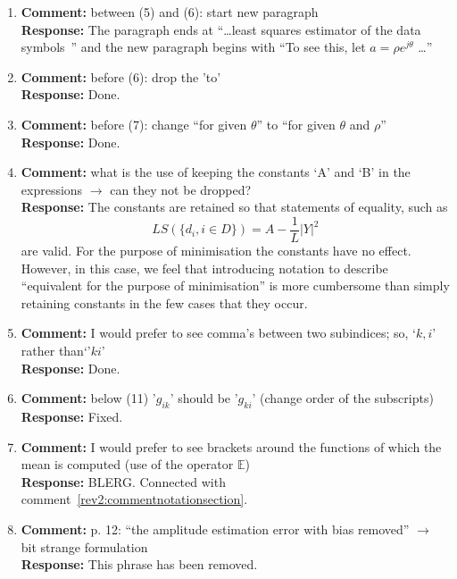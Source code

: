 \documentclass{article}
\newcommand{\abs}[1]{{\left\vert #1 \right\vert}}
\begin{document}
\begin{enumerate}
\item \textbf{Comment:} between (5) and (6): start new paragraph \\
\textbf{Response:} The paragraph ends at ``\dots least squares estimator of the data symbols~\cite{Sweldens2001,Mackenthun1994}'' and the new paragraph begins with ``To see this, let $a = \rho e^{j\theta}$ \dots''

\item \textbf{Comment:} before (6): drop the 'to' \\
\textbf{Response:} Done.

\item \textbf{Comment:} before (7): change ``for given $\theta$'' to ``for given $\theta$ and $\rho$'' \\
\textbf{Response:} Done.

\item \textbf{Comment:} what is the use of keeping the constants `A' and `B' in the expressions $\to$ can they not be dropped? \\
\textbf{Response:} The constants are retained so that statements of equality, such as
\[
LS(\{d_i, i \in D\}) = A - \frac{1}{L}\abs{Y}^2
\]
are valid. For the purpose of minimisation the constants have no effect.  However, in this case, we feel that introducing notation to describe ``equivalent for the purpose of minimisation'' is more cumbersome than simply retaining constants in the few cases that they occur.

\item \textbf{Comment:} I would prefer to see comma's between two subindices; so, `$k,i$' rather than`'$ki$' \\
\textbf{Response:} Done.

\item \textbf{Comment:} below (11) '$g_{ik}$' should be '$g_{ki}$' (change order of the subscripts) \\
\textbf{Response:} Fixed.

\item \label{rev2:commentE} \textbf{Comment:} I would prefer to see brackets around the functions of which the mean is computed (use of the operator $\mathbb E$) \\
\textbf{Response:} BLERG.  Connected with comment~\ref{rev2:commentnotationsection}.

\item \textbf{Comment:} p. 12: ``the amplitude estimation error with bias removed'' $\to$ bit strange formulation \\
\textbf{Response:} This phrase has been removed.


\end{enumerate}
\end{document}
